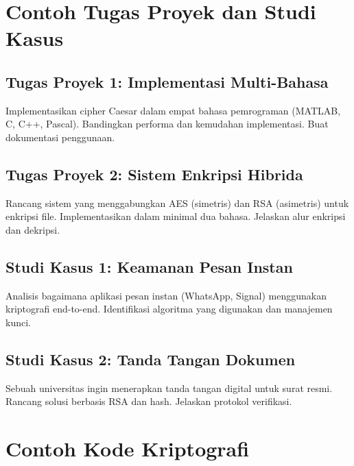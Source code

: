 \documentclass[12pt,a4paper]{article}
\begin{document}
\section{Contoh Tugas Proyek dan Studi Kasus}

\subsection{Tugas Proyek 1: Implementasi Multi-Bahasa}
Implementasikan cipher Caesar dalam empat bahasa pemrograman (MATLAB, C, C++, Pascal). Bandingkan performa dan kemudahan implementasi. Buat dokumentasi penggunaan.

\subsection{Tugas Proyek 2: Sistem Enkripsi Hibrida}
Rancang sistem yang menggabungkan AES (simetris) dan RSA (asimetris) untuk enkripsi file. Implementasikan dalam minimal dua bahasa. Jelaskan alur enkripsi dan dekripsi.

\subsection{Studi Kasus 1: Keamanan Pesan Instan}
Analisis bagaimana aplikasi pesan instan (WhatsApp, Signal) menggunakan kriptografi end-to-end. Identifikasi algoritma yang digunakan dan manajemen kunci.

\subsection{Studi Kasus 2: Tanda Tangan Dokumen}
Sebuah universitas ingin menerapkan tanda tangan digital untuk surat resmi. Rancang solusi berbasis RSA dan hash. Jelaskan protokol verifikasi.

\section{Contoh Kode Kriptografi}
\end{document}
